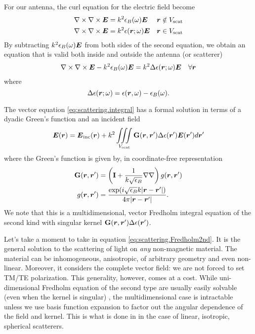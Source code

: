 For our antenna, the curl equation for 
the electric field become
  \begin{subequations}
  \begin{align}
   \nabla\times\nabla\times\boldsymbol{E}	&= k^2\epsilon_B(\omega)\boldsymbol{E}		& \boldsymbol{r}\notin V_\text{scat}	\\
   \nabla\times\nabla\times\boldsymbol{E}	&= k^2\epsilon(\boldsymbol{r};\omega)\boldsymbol{E}	& \boldsymbol{r}\in V_\text{scat}
  \end{align}
  \end{subequations}
By subtracting $k^2\epsilon_B(\omega)\boldsymbol{E}$ from both sides of the second equation, 
we obtain an equation that is valid both inside and outside the antenna (or scatterer)
  \begin{align}
   \nabla\times\nabla\times\boldsymbol{E}-k^2\epsilon_B(\omega)\boldsymbol{E}	&= k^2\Delta\epsilon(\boldsymbol{r};\omega)\boldsymbol{E}	&\forall\boldsymbol{r} \label{eq:scattering.integral}
  \end{align}
where 
  \begin{equation}
    \Delta\epsilon(\boldsymbol{r};\omega)=\epsilon(\boldsymbol{r},\omega)-\epsilon_B(\omega).
  \end{equation}

The vector equation \eqref{eq:scattering.integral} has a formal solution in terms 
of a dyadic Green's function \cite{NOV2012} and an incident field \cite{deL2013}
  \begin{equation}
   \boldsymbol{E}(\boldsymbol{r}) = \boldsymbol{E}_\text{inc}(\boldsymbol{r}) + k^2\mathop{\iiint}_{V_\text{scat}} \mathbf{G}(\boldsymbol{r},\boldsymbol{r}')\Delta\epsilon(\boldsymbol{r}')\boldsymbol{E}(\boldsymbol{r}')d\boldsymbol{r}'\label{eq:scattering.Fredholm2nd}
  \end{equation}
where the Green's function is given by, in coordinate-free representation
  \begin{align}
    \mathbf{G}(\boldsymbol{r},\boldsymbol{r}')	&= \left(\mathbf{I}+\frac{1}{k\sqrt{\epsilon_B}}\nabla\nabla\right)g(\boldsymbol{r},\boldsymbol{r}')	\\
    g(\boldsymbol{r},\boldsymbol{r}')		&= \frac{\exp(i\sqrt{\epsilon_B}k|\boldsymbol{r}-\boldsymbol{r}'|)}{4\pi|\boldsymbol{r}-\boldsymbol{r}'|}.
  \end{align}
We note that this is a multidimensional, vector Fredholm integral equation of the second kind with
singular kernel $\mathbf{G}(\boldsymbol{r},\boldsymbol{r}')\Delta\epsilon(\boldsymbol{r}')$.

Let's take a moment to take in equation \eqref{eq:scattering.Fredholm2nd}. It is the general
solution to the scattering of light on \textit{any} non-magnetic material. The material can be
inhomogeneous, anisotropic, of arbitrary geometry and even non-linear. Moreover, it considers
the complete vector field: we are not forced to set TM/TE polarization. This generality, however, 
comes at a cost. While uni-dimensional Fredholm equation of the second type are usually easily solvable
(even when the kernel is singular) \cite{DEL1985}, the multidimensional case is intractable unless
we use basis function expansion to factor out the angular dependence of the 
field and kernel. This is what is done in \cite{deL2013} in the case of linear, isotropic, 
spherical scatterers.

